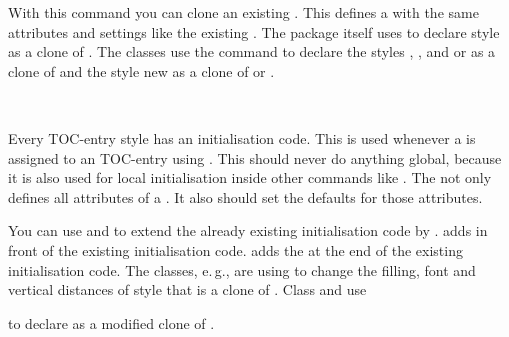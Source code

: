 \begin{Declaration}
\end{Declaration}
%
With this command you can clone
an existing . This defines a  with the same
attributes and settings like the existing . The package itself
uses  to declare style  as a clone
of . The \KOMAScript{} classes use the command to
declare the styles , , and  or
 as a clone of  and the style
 new as a clone of  or .%
%

\begin{Declaration}
                               \\
\end{Declaration}
%
%
Every TOC-entry style has an
initialisation code. This is used whenever a  is assigned to an
TOC-entry using . This  should
never do anything global, because it is also used for local initialisation
inside other commands like . The
 not only defines all attributes of a . It
also should set the defaults for those attributes.

You can use  and
 to extend the already existing initialisation
code by .  adds
 in front of the existing initialisation
code.  adds the  at the end
of the existing initialisation code. The \KOMAScript{} classes, e.\,g., are
using  to change the filling, font and
vertical distances of style  that is a clone of
. Class  and  use
\begin{lstcode}[belowskip=\dp\strutbox plus 1pt]
  \TOCEntryStyleStartInitCode{section}{%
    \expandafter\providecommand%
    \csname scr@tso@#1@linefill\endcsname
    {\TOCLineLeaderFill\relax}%
  }
\end{lstcode}
to declare  as a modified clone of .%
%
%

